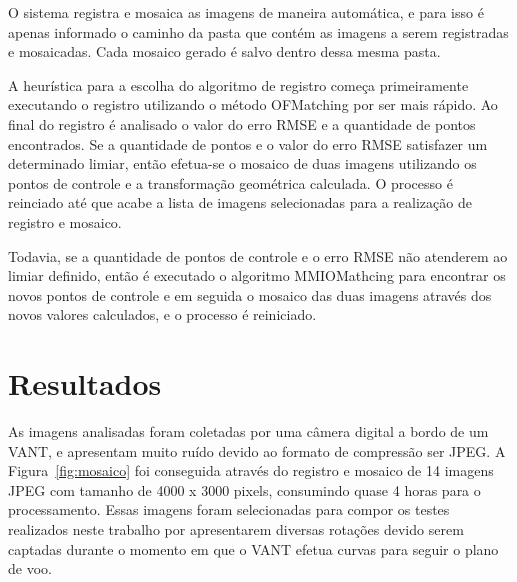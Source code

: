 \documentclass[9pt, a4paper, nofonttune, journal]{IEEEtran}
\begin{document}
O sistema registra e mosaica as imagens de maneira automática, e para isso é apenas informado o caminho da pasta que contém as imagens a serem registradas e mosaicadas. Cada mosaico gerado é salvo dentro dessa mesma pasta.

A heurística para a escolha do algoritmo de registro começa primeiramente executando o registro utilizando o método OFMatching por ser mais rápido. Ao final do registro é analisado o valor do erro RMSE e a quantidade de pontos encontrados. Se a quantidade de pontos e o valor do erro RMSE satisfazer um determinado limiar, então efetua-se o mosaico de duas imagens utilizando os pontos de controle e a transformação geométrica calculada. O processo é reinciado até que acabe a lista de imagens selecionadas para a realização de registro e mosaico.

Todavia, se a quantidade de pontos de controle e o erro RMSE não atenderem ao limiar definido, então é executado o algoritmo MMIOMathcing para encontrar os novos pontos de controle e em seguida o mosaico das duas imagens através dos novos valores calculados, e o processo é reiniciado.

\section{Resultados}

As imagens analisadas foram coletadas por uma câmera digital a bordo de um VANT, e apresentam muito ruído devido ao formato de compressão ser JPEG. A Figura~\ref{fig:mosaico} foi conseguida através do registro e mosaico de 14 imagens JPEG com tamanho de 4000 x 3000 pixels, consumindo quase 4 horas para o processamento. Essas imagens foram selecionadas para compor os testes realizados neste trabalho por apresentarem diversas rotações devido serem captadas durante o momento em que o VANT efetua curvas para seguir o plano de voo.
\end{document}
